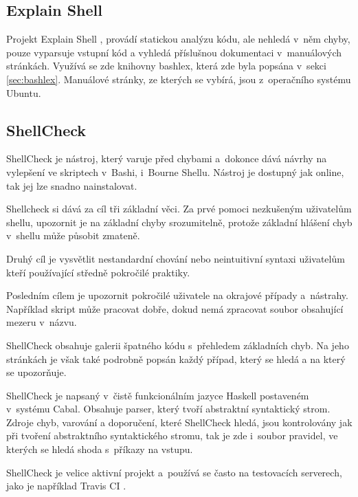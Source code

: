 \documentclass[thesis=M,czech]{FITthesis}[2012/06/26]
\begin{document}
%
%
\subsection{Explain Shell}

Projekt Explain Shell \cite{explainshell}, provádí statickou analýzu kódu, ale nehledá v~něm chyby, pouze vyparsuje vstupní kód a vyhledá příslušnou dokumentaci v~manuálových stránkách. Využívá se zde knihovny bashlex, která zde byla popsána v~sekci \ref{sec:bashlex}. Manuálové stránky, ze kterých se vybírá, jsou z~operačního systému Ubuntu.


%
%
\subsection{ShellCheck}

ShellCheck \cite{shellcheck} je nástroj, který varuje před chybami a~dokonce dává návrhy na vylepšení ve skriptech v~Bashi, i~Bourne Shellu. Nástroj je dostupný jak online, tak jej lze snadno nainstalovat.

Shellcheck si dává za cíl tři základní věci. Za prvé pomoci nezkušeným uživatelům shellu, upozornit je na základní chyby srozumitelně, protože základní hlášení chyb v~shellu může působit zmateně.

Druhý cíl je vysvětlit nestandardní chování nebo neintuitivní syntaxi uživatelům kteří používající středně pokročilé praktiky.

Posledním cílem je upozornit pokročilé uživatele na okrajové případy a~nástrahy. Například skript může pracovat dobře, dokud nemá zpracovat soubor obsahující mezeru v~názvu.

ShellCheck obsahuje galerii špatného kódu s~přehledem základních chyb. Na jeho stránkách je však také podrobně popsán každý případ, který se hledá a na který se upozorňuje.

ShellCheck je napsaný v~čistě funkcionálním jazyce Haskell \cite{haskell} postaveném v~systému Cabal. Obsahuje parser, který tvoří abstraktní syntaktický strom. Zdroje chyb, varování a doporučení, které ShellCheck hledá, jsou kontrolovány jak při tvoření abstraktního syntaktického stromu, tak je zde i~soubor pravidel, ve kterých se hledá shoda s~příkazy na vstupu.

ShellCheck je velice aktivní projekt a~používá se často na testovacích serverech, jako je například Travis CI \cite{travisci}.
\end{document}

